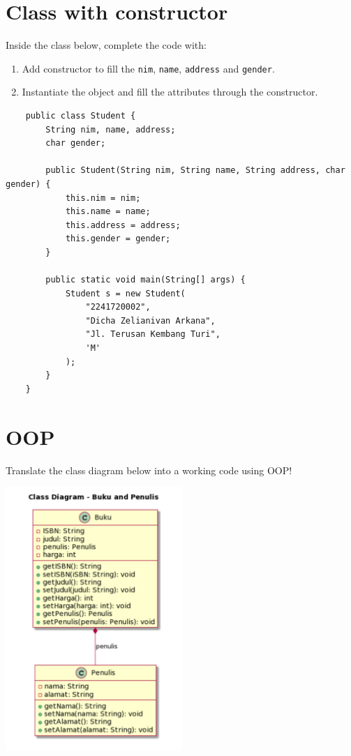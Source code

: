 \documentclass[12pt,titlepage]{article}
\begin{document}
\section{Class with constructor}
Inside the class below, complete the code with:
\begin{enumerate}
    \item {
        Add constructor to fill the \texttt{nim}, \texttt{name}, \texttt{address} and \texttt{gender}.
    }
    \item {
        Instantiate the object and fill the attributes through the constructor.
    }
\end{enumerate}

\pagebreak

\begin{verbatim}
    public class Student {
        String nim, name, address;
        char gender;

        public Student(String nim, String name, String address, char gender) {
            this.nim = nim;
            this.name = name;
            this.address = address;
            this.gender = gender;
        }

        public static void main(String[] args) {
            Student s = new Student(
                "2241720002",
                "Dicha Zelianivan Arkana",
                "Jl. Terusan Kembang Turi",
                'M'
            );
        }
    }
\end{verbatim}

\pagebreak

\section{OOP}
Translate the class diagram below into a working code using OOP!

\begin{center}
    \includegraphics[height=10cm]{./images/class-diagram.png}
\end{center}
\end{document}

